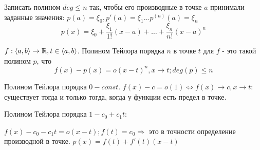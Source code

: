 \documentclass[12pt]{report}
\begin{document}
\begin{probl}
Записать полином $deg \le n$ так, чтобы его производные в точке $a$ принимали заданные значения: $p(a) = \xi_0, p'(a) = \xi_1 \dots p^{(n)}(a) = \xi_n$
$$p(x) = \xi_0 + \frac{\xi_1}{1!}(x - a) + \dots + \frac{\xi_n}{n!}(x - a)^n$$
\end{probl}

\begin{defn}
$f: \left<a, b\right> \to \mathbb{R}, t \in \left<a, b\right>$. Полином Тейлора порядка $n$ в точке $t$ для $f$ - это такой полином $p$, что 
$$f(x) - p(x) = o(x - t)^n, x \to t; deg(p) \le n$$
\end{defn}

\begin{note}
Полином Тейлора порядка $0 - const$. $f(x) - c = o(1) \Leftrightarrow f(x) \to c, x \to t$: существует тогда и только тогда, когда у функции есть предел в точке.

Полином Тейлора порядка $1 - c_0 + c_1t$:

$f(x) - c_0 - c_1t = o(x - t); f(t) = c_0 \Rightarrow$ это в точности определение производной в точке. $p(x) = f(t) + f'(t)(x - t)$  
\end{note}
\end{document}
